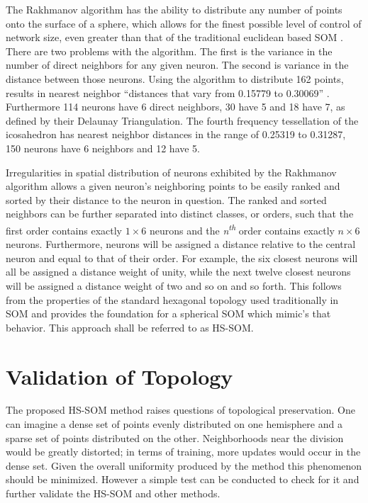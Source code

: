 \documentclass[12pt]{article}
\begin{document}
The Rakhmanov algorithm has the ability to distribute any number of points
onto the surface of a sphere, which allows for the finest possible level of
control of network size, even greater than that of the traditional euclidean
based SOM \citep{Rakhmanov94}.  There are two problems with the \citeauthor{Rakhmanov94}
algorithm. The first is the variance in the number of direct neighbors for any
given neuron.  The second is variance in the distance between those neurons.
Using the algorithm to distribute 162 points, results in nearest neighbor
``distances that vary from 0.15779 to 0.30069'' \cite[pg 3]{wu2005}.
Furthermore 114 neurons have 6 direct neighbors, 30 have 5 and 18 have 7, as
defined by their Delaunay Triangulation.  The fourth frequency tessellation of
the icosahedron has nearest neighbor distances in the range of 0.25319 to
0.31287, 150 neurons have 6 neighbors and 12 have 5.

Irregularities in spatial distribution of neurons exhibited by the Rakhmanov
algorithm allows a given neuron's neighboring points to be easily ranked
and sorted by their distance to the neuron in question.  The ranked and sorted
neighbors can be further separated into distinct classes, or orders, such that
the first order contains exactly \begin{math}1\times6\end{math} neurons and
the \textit{n\textsuperscript{th}} order contains exactly
\begin{math}n\times6\end{math} neurons.  Furthermore, neurons will be assigned
a distance relative to the central neuron and equal to that of their order.
For example, the six closest neurons will all be assigned a distance weight of
unity, while the next twelve closest neurons will be assigned a distance
weight of two and so on and so forth.  This follows from the properties of the
standard hexagonal topology used traditionally in SOM and provides the
foundation for a spherical SOM which mimic's that behavior.  This approach
shall be referred to as HS-SOM.

\section{Validation of Topology}
The proposed HS-SOM method raises questions of topological preservation.  One
can imagine a dense set of points evenly distributed on one hemisphere and a
sparse set of points distributed on the other. Neighborhoods near the division
would be greatly distorted; in terms of training, more updates would occur in
the dense set.  Given the overall uniformity produced by the
\citeauthor{Rakhmanov94} method this phenomenon should be minimized. However a
simple test can be conducted to check for it and further validate the HS-SOM
and other methods.
\end{document}

